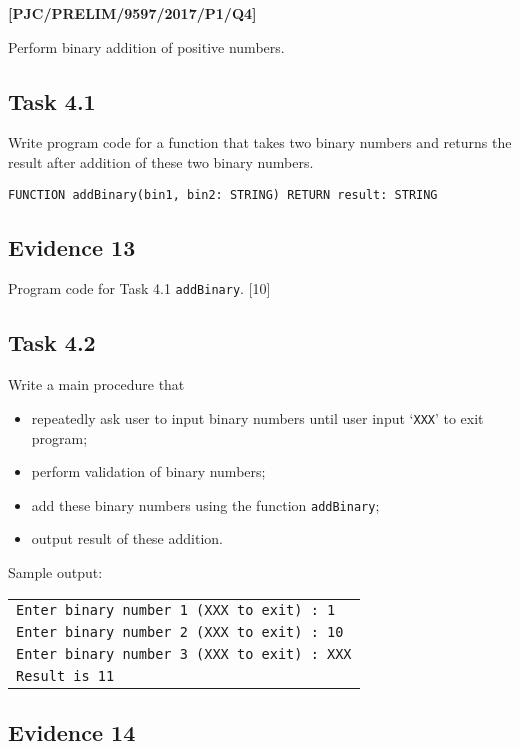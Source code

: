 \item \textbf{{[}PJC/PRELIM/9597/2017/P1/Q4{]} }

Perform binary addition of positive numbers. 

\subsection*{Task 4.1 }

Write program code for a function that takes two binary numbers and
returns the result after addition of these two binary numbers.
\noindent \begin{center}
\texttt{FUNCTION addBinary(bin1, bin2: STRING) RETURN result: STRING }
\par\end{center}

\subsection*{Evidence 13 }

Program code for Task 4.1 \texttt{addBinary}. \hfill{}{[}10{]}

\subsection*{Task 4.2}

Write a main procedure that 
\begin{itemize}
\item repeatedly ask user to input binary numbers until user input \textquoteleft \texttt{XXX}\textquoteright{}
to exit program; 
\item perform validation of binary numbers; 
\item add these binary numbers using the function \texttt{addBinary}; 
\item output result of these addition. 
\end{itemize}
Sample output: 
\noindent \begin{center}
\begin{tabular}{|l|}
\hline 
\texttt{Enter binary number 1 (XXX to exit) : 1}\tabularnewline
\texttt{Enter binary number 2 (XXX to exit) : 10}\tabularnewline
\texttt{Enter binary number 3 (XXX to exit) : XXX}\tabularnewline
\texttt{Result is 11 }\tabularnewline
\hline 
\end{tabular}
\par\end{center}

\subsection*{Evidence 14 }

